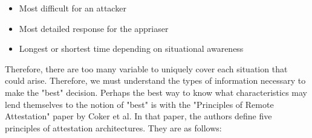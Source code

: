 \documentclass[10pt]{report}
\newcommand{\squash}{\itemsep=0pt\parskip=0pt}
\begin{document}
\begin{itemize}
  \squash
  \item Most difficult for an attacker
  \item Most detailed response for the appriaser
  \item Longest or shortest time depending on situational awareness
\end{itemize}

Therefore, there are too many variable to uniquely cover
each situation that could arise. Therefore, we must understand
the types of information necessary to make the "best" decision. 
Perhaps the best way to know what characteristics may lend
themselves to the notion of "best" is with the "Principles of Remote 
Attestation" paper by Coker et al. In that paper, the authors define
five principles of attestation architectures. They are as follows: 
\end{document}
